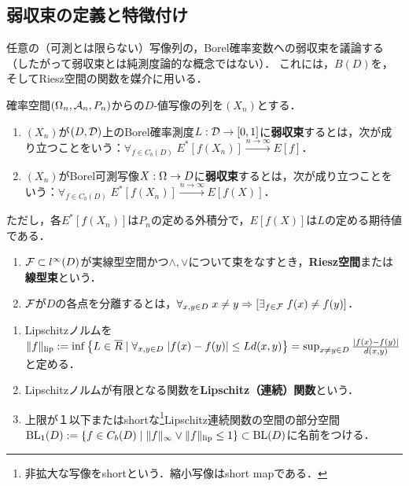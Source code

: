 \documentclass[uplatex,dvipdfmx]{jsreport}
\begin{document}
\subsection{弱収束の定義と特徴付け}

\begin{tcolorbox}[colframe=ForestGreen, colback=ForestGreen!10!white,breakable,colbacktitle=ForestGreen!40!white,coltitle=black,fonttitle=\bfseries\sffamily,
title=]
    任意の（可測とは限らない）写像列の，Borel確率変数への弱収束を議論する
    （したがって弱収束とは純測度論的な概念ではない）．
    これには，$B(D)$を，そしてRiesz空間の関数を媒介に用いる．
\end{tcolorbox}

\begin{definition}
    確率空間$(\Omega_n,\mathcal{A}_n,P_n)$からの$D$-値写像の列を$(X_n)$とする．
    \begin{enumerate}
        \item $(X_n)$が$(D,\mathcal{D})$上のBorel確率測度$L:\mathcal{D}\to[0,1]$に\textbf{弱収束}するとは，次が成り立つことをいう：$\forall_{f\in C_b(D)}\;E^*[f(X_n)]\xrightarrow{n\to\infty}E[f]$．
        \item $(X_n)$がBorel可測写像$X:\Omega\to D$に\textbf{弱収束}するとは，次が成り立つことをいう：$\forall_{f\in C_b(D)}\;E^*[f(X_n)]\xrightarrow{n\to\infty}E[f(X)]$．
    \end{enumerate}
    ただし，各$E^*[f(X_n)]$は$P_n$の定める外積分で，$E[f(X)]$は$L$の定める期待値である．
\end{definition}

\begin{definition}\mbox{}
    \begin{enumerate}
        \item $\mathcal{F}\subset l^\infty(D)$が実線型空間かつ$\land,\lor$について束をなすとき，\textbf{Riesz空間}または\textbf{線型束}という．
        \item $\mathcal{F}$が$D$の各点を分離するとは，$\forall_{x,y\in D}\;x\ne y\Rightarrow[\exists_{f\in\mathcal{F}}\;f(x)\ne f(y)]$．
    \end{enumerate}
\end{definition}

\begin{definition}\mbox{}
    \begin{enumerate}
        \item Lipschitzノルムを$\|f\|_{\textrm{lip}}:=\inf\left\{L\in\overline{R}\mid\forall_{x,y\in D}\;\lvert f(x)-f(y)\rvert\le Ld(x,y)\right\}=\sup_{x\ne y\in D}\frac{\lvert f(x)-f(y)\rvert}{d(x,y)}$と定める．
        \item Lipschitzノルムが有限となる関数を\textbf{Lipschitz（連続）関数}という．
        \item 上限が１以下またはshortな\footnote{非拡大な写像をshortという．縮小写像はshort mapである．}Lipschitz連続関数の空間の部分空間$\mathrm{BL}_1(D):=\left\{f\in C_b(D)\mid \|f\|_\infty\lor\|f\|_{\textrm{lip}}\le1\right\}\subset\mathrm{BL}(D)$に名前をつける．
    \end{enumerate}
\end{definition}
\end{document}
